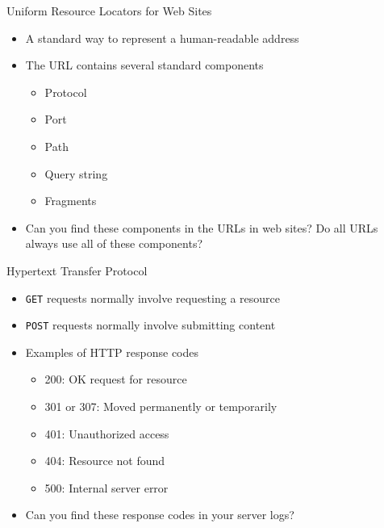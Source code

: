 \documentclass[14pt,aspectratio=169]{beamer}
\begin{document}
%
\begin{frame}{Uniform Resource Locators for Web Sites}
  \begin{itemize}
    \item A standard way to represent a human-readable address
    \item The URL contains several standard components
      \begin{itemize}
        \item Protocol
        \item Port
        \item Path
        \item Query string
        \item Fragments
      \end{itemize}
      \vspace*{-.2in}
    \item Can you find these components in the URLs in web sites?
      Do all URLs always use all of these components?
  \end{itemize}
\end{frame}

%
\begin{frame}{Hypertext Transfer Protocol}
  \begin{itemize}
    \item {\tt GET} requests normally involve requesting a resource
    \vspace*{-.1in}
    \item {\tt POST} requests normally involve submitting content
    \vspace*{-.1in}
    \item Examples of HTTP response codes
      \begin{itemize}
        \item 200: OK request for resource
        \item 301 or 307: Moved permanently or temporarily
        \item 401: Unauthorized access
        \item 404: Resource not found
        \item 500: Internal server error
      \end{itemize}
      \vspace*{-.2in}
    \item Can you find these response codes in your server logs?
  \end{itemize}
\end{frame}
\end{document}
